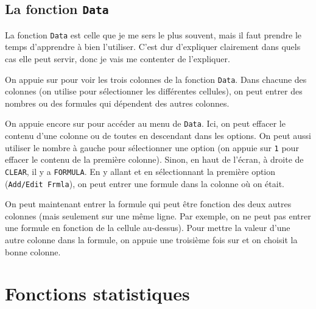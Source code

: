 \documentclass[french]{article}
\begin{document}
\subsection{La fonction \texttt{Data}}
La fonction \texttt{Data} est celle que je me sers le plus souvent, mais il faut prendre le temps d'apprendre à bien l'utiliser. C'est dur d'expliquer clairement dans quels cas elle peut servir, donc je vais me contenter de l'expliquer.

On appuie sur  pour voir les trois colonnes de la fonction \texttt{Data}. Dans chacune des colonnes (on utilise  pour sélectionner les différentes cellules), on peut entrer des nombres ou des formules qui dépendent des autres colonnes.

On appuie encore sur  pour accéder au menu de \texttt{Data}. Ici, on peut effacer le contenu d'une colonne ou de toutes en descendant dans les options. On peut aussi utiliser le nombre à gauche pour sélectionner une option (on appuie sur \texttt{1} pour effacer le contenu de la première colonne). Sinon, en haut de l'écran, à droite de \texttt{CLEAR}, il y a \texttt{FORMULA}. En y allant et en sélectionnant la première option (\texttt{Add/Edit Frmla}), on peut entrer une formule dans la colonne où on était. 

On peut maintenant entrer la formule qui peut être fonction des deux autres colonnes (mais seulement sur une même ligne. Par exemple, on ne peut pas entrer une formule en fonction de la cellule au-dessus). Pour mettre la valeur d'une autre colonne dans la formule, on appuie une troisième fois sur  et on choisit la bonne colonne.

\section{Fonctions statistiques}
\end{document}
